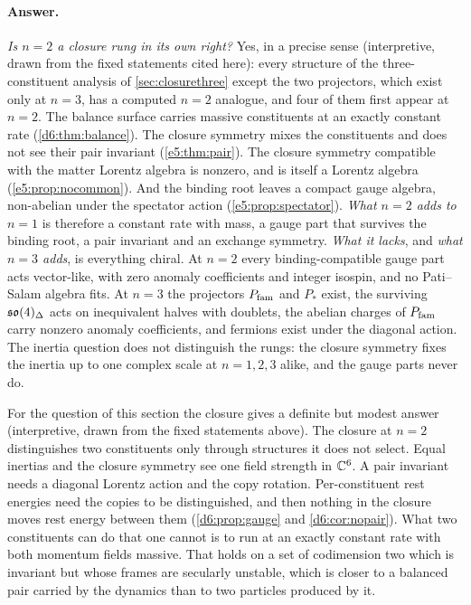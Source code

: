 \paragraph{Answer.} \emph{Is $n=2$ a closure rung in its own right?} Yes, in a precise sense (interpretive, drawn from the fixed statements cited here):
every structure of the three-constituent analysis of \cref{sec:closurethree} except the two projectors, which exist only at $n=3$, has a computed $n=2$
analogue, and four of them first appear at $n=2$. The balance surface carries massive constituents at
an exactly constant rate (\cref{d6:thm:balance}). The closure symmetry mixes the constituents and does not see their pair invariant
(\cref{e5:thm:pair}). The closure symmetry compatible with the matter Lorentz algebra is nonzero, and is itself a Lorentz algebra (\cref{e5:prop:nocommon}).
And the binding root leaves a compact gauge algebra, non-abelian under the spectator action (\cref{e5:prop:spectator}). \emph{What $n=2$ adds to $n=1$} is
therefore a constant rate with mass, a gauge part that survives the binding root, a pair invariant and an exchange symmetry. \emph{What it lacks}, and
\emph{what $n=3$ adds}, is everything chiral. At $n=2$ every binding-compatible gauge part acts vector-like, with zero anomaly coefficients and integer
isospin, and no Pati--Salam algebra fits. At $n=3$ the projectors $P_{\rm fam}$ and $P_*$ exist, the surviving $\mathfrak{so}(4)_\Delta$ acts on inequivalent halves
with doublets, the abelian charges of $P_{\rm fam}$ carry nonzero anomaly coefficients, and fermions exist under the diagonal action. The inertia question does
not distinguish the rungs: the closure symmetry fixes the inertia up to one complex scale at $n=1,2,3$ alike, and the gauge parts never do.

For the question of this section the closure gives a definite but modest answer (interpretive, drawn from the fixed statements above). The closure at $n=2$
distinguishes two constituents only through structures it does not select. Equal inertias and the closure symmetry see one field strength in $\mathbb{C}^6$. A
pair invariant needs a diagonal Lorentz action and the copy rotation. Per-constituent rest energies need the copies to be distinguished, and then nothing in
the closure moves rest energy between them (\cref{d6:prop:gauge} and \cref{d6:cor:nopair}). What two constituents can do that one cannot is to run at
an exactly constant rate with both momentum fields massive. That holds on a set of codimension two which is invariant but whose frames are secularly
unstable, which is closer to a balanced pair carried by the dynamics than to two particles produced by it.

